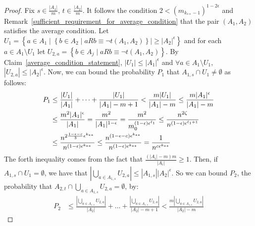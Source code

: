         \begin{proof}
            Fix $s \in \frac{|A_1|}{m}$, $t \in \frac{|A_2|}{m}$.
            It follows the condition $2 < (m_{k_{**}-1})^{1-2\epsilon}$ and Remark~\ref{sufficient_requirement_for_average_condition}
            that the pair $(A_{1}, A_{2})$ satisfies the average condition.
            Let $U_1 = \left\{ a \in A_1 \mid \left\{ b \in A_2 \mid a R b \equiv \neg t(A_1, A_2) \right\}| \geq |A_2|^\epsilon \right\}$
            and for each $a \in A_1 \setminus U_1$ let $U_{2,a} = \left\{ b \in A_j \mid a R b \equiv \neg t(A_1, A_2) \right\}$.
            By Claim~\ref{average_condition_statement}, $|U_1| \leq |A_1|^\epsilon$ and $\forall a \in A_1 \setminus U_1$,
            $|U_{2,a}| \leq |A_2|^\epsilon$.
            Now, we can bound the probability $P_1$ that $A_{1,s} \cap U_1 \neq \emptyset$ as follows:
            \[
                \begin{split}
                    P_1
                        & \leq \frac{|U_1|}{|A_1|} + \dots + \frac{|U_1|}{|A_1|-m+1}
                            < \frac{m |U_1|}{|A_1| - m}
                            \leq \frac{m |A_1|^\epsilon}{|A_1| - m} \\
                        & \leq \frac{m^2 |A_1|^\epsilon}{|A_1|}
                            = \frac{m^2}{|A_1|^{1-\epsilon}}
                            = \frac{m^2}{m_0^{\parround{1-\epsilon} \epsilon^{\ell_1}}} %
                            \leq \frac{n^{2 \zeta}}{n^{(1-\epsilon)\epsilon^{\ell_1 + 1}}} \\
                        & \leq \frac{n^{2\frac{1-\epsilon-c}{3} \epsilon^{k_{**}}}}{n^{(1-\epsilon)\epsilon^{k_{**}}}}
                            \leq \frac{n^{(1-\epsilon-c) \epsilon^{k_{**}}}}{n^{(1-\epsilon)\epsilon^{k_{**}}}}
                            = \frac{1}{n^{c \epsilon^{k_{**}}}}
                \end{split}
            \]
            The forth inequality comes from the fact that $\frac{(|A_i| - m) m}{|A_i|} \geq 1$.
            Then, if $A_{1,s} \cap U_1= \emptyset$, we have that $|\bigcup_{a \in A_{1,s}} U_{2,a}| \leq |A_{1,s}| |A_2|^\epsilon$.
            So we can bound $P_2$, the probability that $A_{2,t} \cap \bigcup_{a \in A_{1,s}} U_{2,a} = \emptyset$, by:
            \[
                \begin{split}
                    P_2
                        & \leq \frac{|\bigcup_{a \in A_{1,s}} U_{2,a}|}{|A_2|} + \dots + \frac{|\bigcup_{a \in A_{1,s}} U_{2,a}|}{|A_2|-m+1}
                            < \frac{m |\bigcup_{a \in A_{1,s}} U_{2,a}|}{|A_2| - m}

\end{split}\]
\end{proof}
